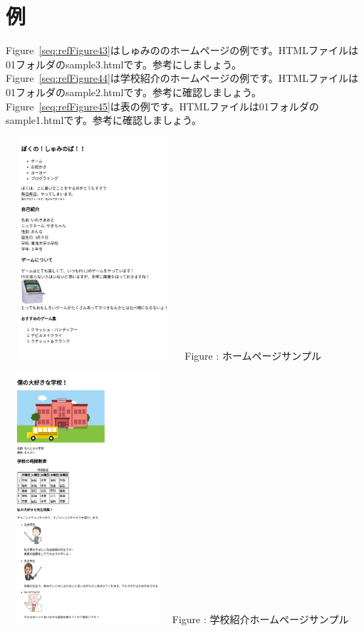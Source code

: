 \documentclass[a4paper,12pt]{jarticle}
\begin{document}
\section{例}
 {Figure~\ref{seq:refFigure43}はしゅみののホームページの例です。HTMLファイルは01フォルダのsample3.htmlです。参考にしましょう。}\\
{Figure~\ref{seq:refFigure44}は学校紹介のホームページの例です。HTMLファイルは01フォルダのsample2.htmlです。参考に確認しましょう。}\\
{Figure~\ref{seq:refFigure45}は表の例です。HTMLファイルは01フォルダのsample1.htmlです。参考に確認しましょう。}\\

\centering
\begin{minipage}{7.518cm}
  {\upshape
    \includegraphics[width=6.525cm,height=8.262cm]{textbook-img209.png}
    \newline
    Figure {\theFigure\label{seq:refFigure43}}:
    ホームページサンプル}
\end{minipage}
\begin{minipage}{7.703cm}
  {\upshape
    \includegraphics[width=6.062cm,height=9.306cm]{textbook-img210.png}
    \newline
    Figure {\theFigure\label{seq:refFigure44}}:
    学校紹介ホームページサンプル}
\end{minipage}
\end{document}
